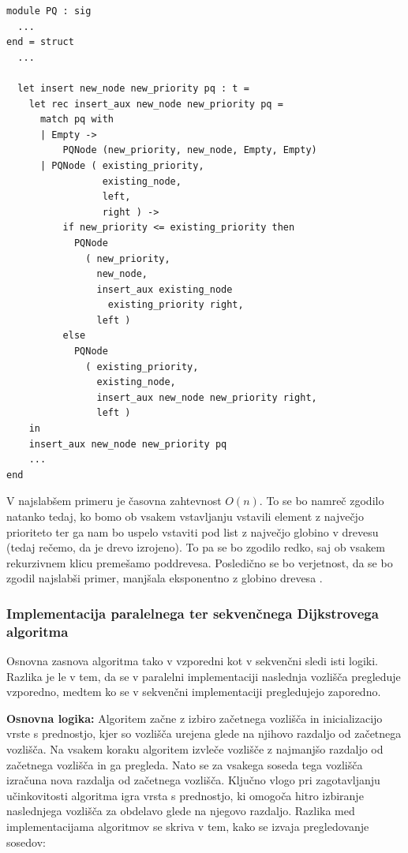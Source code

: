 \documentclass[mat1, tisk]{fmfdelo}
\begin{document}
\begin{lstlisting}[label=lst:pq_insert]
module PQ : sig
  ...
end = struct
  ...

  let insert new_node new_priority pq : t =
    let rec insert_aux new_node new_priority pq =
      match pq with
      | Empty -> 
          PQNode (new_priority, new_node, Empty, Empty)
      | PQNode ( existing_priority, 
                 existing_node, 
                 left, 
                 right ) ->
          if new_priority <= existing_priority then
            PQNode
              ( new_priority,
                new_node,
                insert_aux existing_node 
                  existing_priority right,
                left )
          else
            PQNode
              ( existing_priority,
                existing_node,
                insert_aux new_node new_priority right,
                left )
    in
    insert_aux new_node new_priority pq
    ...
end
\end{lstlisting}

V najslabšem primeru je časovna zahtevnost $O(n)$. To se bo namreč zgodilo natanko tedaj, ko bomo ob vsakem vstavljanju
vstavili element z največjo prioriteto ter ga nam bo uspelo vstaviti pod list z največjo globino v drevesu (tedaj
rečemo, da je drevo izrojeno). To pa se bo zgodilo redko, saj ob vsakem rekurzivnem klicu premešamo poddrevesa.
Posledično se bo verjetnost, da se bo zgodil najslabši primer, manjšala eksponentno z globino drevesa \cite{okasaki1996}.

\subsubsection{Implementacija paralelnega ter sekvenčnega Dijkstrovega algoritma}

Osnovna zasnova algoritma tako v vzporedni kot v sekvenčni sledi isti logiki. Razlika je le v tem, da se v paralelni
implementaciji naslednja vozlišča pregleduje vzporedno, medtem ko se v sekvenčni implementaciji pregledujejo zaporedno.

\textbf{Osnovna logika: } Algoritem začne z izbiro začetnega vozlišča in inicializacijo vrste s prednostjo, kjer so
vozlišča urejena glede na njihovo razdaljo od začetnega vozlišča. Na vsakem koraku algoritem izvleče vozlišče z najmanjšo
razdaljo od začetnega vozlišča in ga pregleda. Nato se za vsakega soseda tega vozlišča izračuna nova razdalja od začetnega
vozlišča. Ključno vlogo pri zagotavljanju učinkovitosti algoritma igra vrsta s prednostjo, ki omogoča hitro izbiranje
naslednjega vozlišča za obdelavo glede na njegovo razdaljo. Razlika med implementacijama algoritmov se skriva v tem,
kako se izvaja pregledovanje sosedov:
\end{document}
